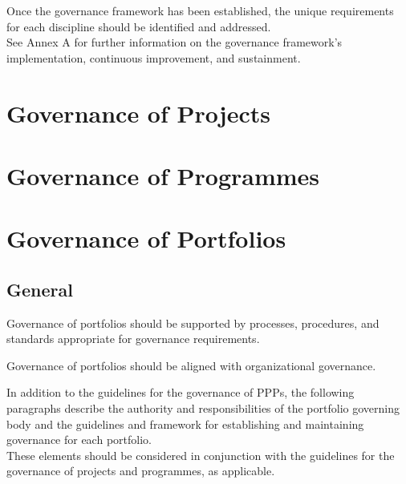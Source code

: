 \documentclass[letterpaper,10pt,english]{jupyterBook}
\begin{document}
\sphinxAtStartPar
Once the governance framework has been established, the unique requirements for each discipline should be identified and addressed. \\
See Annex A for further information on the governance framework’s implementation, continuous improvement, and sustainment.


\section{Governance of Projects}
\label{\detokenize{PM/ppm:governance-of-projects}}

\section{Governance of Programmes}
\label{\detokenize{PM/ppm:governance-of-programmes}}

\section{Governance of Portfolios}
\label{\detokenize{PM/ppm:governance-of-portfolios}}

\subsection{General}
\label{\detokenize{PM/ppm:id3}}
\sphinxAtStartPar
Governance of portfolios should be supported by processes, procedures, and standards appropriate for governance requirements.

\sphinxAtStartPar
Governance of portfolios should be aligned with organizational governance.

\sphinxAtStartPar
In addition to the guidelines for the governance of PPPs, the following paragraphs describe the authority and responsibilities of the portfolio governing body and the guidelines
and framework for establishing and maintaining governance for each portfolio. \\
These elements should be considered in conjunction with the guidelines for the governance of projects and
programmes, as applicable.
\end{document}
